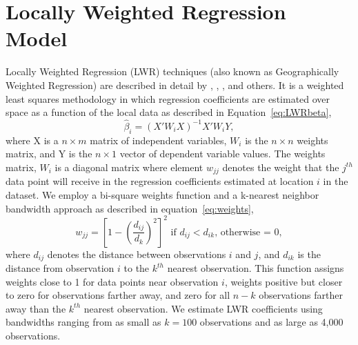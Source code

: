 \documentclass{article}\usepackage{graphicx, color}
\begin{document}
\section{Locally Weighted Regression Model}
Locally Weighted Regression (LWR) techniques (also known as Geographically Weighted Regression) are described in detail by \citet{Cleveland1988}, \citet{Brunsdon1998b}, \citet{Fotheringham2002}, and others. It is a weighted least squares methodology in which regression coefficients are estimated over space as a function of the local data as described in Equation~\eqref{eq:LWRbeta},
\begin{equation}\label{eq:LWRbeta}
\hat{\beta}_i = (X'W_iX)^{-1}X'W_iY,
\end{equation}
where X is a $n \times m$ matrix of independent variables, $W_i$ is the $n \times n$ weights matrix, and Y is the $n \times 1$ vector of dependent variable values. The weights matrix, $W_i$ is a diagonal matrix where element $w_{jj}$ denotes the weight that the $j^{th}$ data point will receive in the regression coefficients estimated at location $i$ in the dataset. We employ a bi-square weights function and a k-nearest neighbor bandwidth approach as described in equation~\eqref{eq:weights}, 
\begin{equation}\label{eq:weights}
w_{jj}=\left[1-\left(\frac{d_{ij}}{d_{k}}\right)^2 \right]^2 \textrm{ if  }d_{ij}<d_{ik}\textrm{, otherwise = 0},
\end{equation}
where $d_{ij}$ denotes the distance between observations $i$ and $j$, and $d_{ik}$ is the distance from observation $i$ to the $k^{th}$ nearest observation. This function assigns weights close to 1 for data points near observation $i$, weights positive but closer to zero for observations farther away, and zero for all $n-k$ observations farther away than the $k^{th}$ nearest observation. We estimate LWR coefficients using bandwidths ranging from as small as $k=100$ observations and as large as 4,000 observations. 
\end{document}

